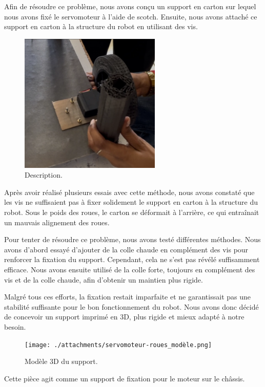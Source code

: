 \documentclass[a4paper,12pt]{report}  %
\begin{document}
Afin de résoudre ce problème, nous avons conçu un support en carton sur lequel nous avons fixé le servomoteur à l’aide de scotch. Ensuite, nous avons attaché ce support en carton à la structure du robot en utilisant des vis. 

\begin{figure}[H]
	\centering
	\includegraphics[width=0.6\textwidth]{./attachments/servomoteur-roues_vis.png}
	\caption{Description.}
\end{figure}

Après avoir réalisé plusieurs essais avec cette méthode, nous avons constaté que les vis ne suffisaient pas à fixer solidement le support en carton à la structure du robot. Sous le poids des roues, le carton se déformait à l’arrière, ce qui entraînait un mauvais alignement des roues.

Pour tenter de résoudre ce problème, nous avons testé différentes méthodes. Nous avons d’abord essayé d’ajouter de la colle chaude en complément des vis pour renforcer la fixation du support. Cependant, cela ne s’est pas révélé suffisamment efficace. Nous avons ensuite utilisé de la colle forte, toujours en complément des vis et de la colle chaude, afin d’obtenir un maintien plus rigide.

Malgré tous ces efforts, la fixation restait imparfaite et ne garantissait pas une stabilité suffisante pour le bon fonctionnement du robot. Nous avons donc décidé de concevoir un support imprimé en 3D, plus rigide et mieux adapté à notre besoin.

\begin{figure}[H]
	\centering
	\texttt{[image: ./attachments/servomoteur-roues\_modèle.png]}
	\caption{Modèle 3D du support.}
\end{figure}

Cette pièce agit comme un support de fixation pour le moteur sur le châssis.
\end{document}
